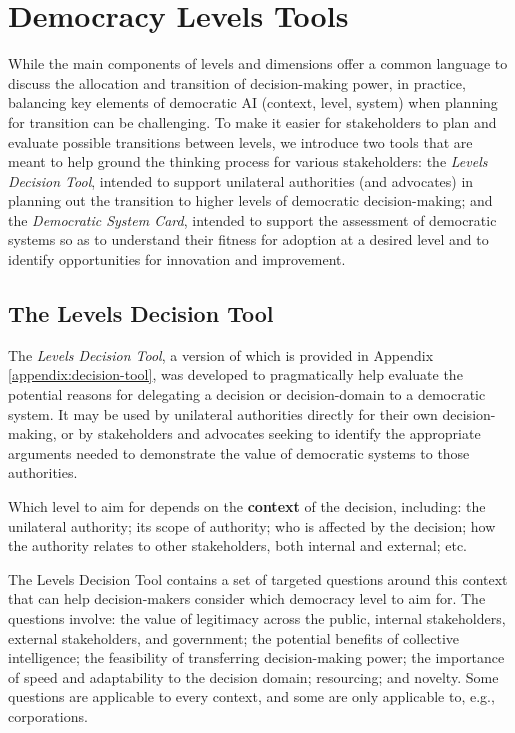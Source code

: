 \documentclass{article}
\begin{document}
\section{Democracy Levels Tools}
\label{sec:application}

    While the main components of levels and dimensions offer a common language to discuss the allocation and transition of decision-making power, in practice, balancing key elements of democratic AI (context, level, system) when planning for transition can be challenging. 
    To make it easier for stakeholders to plan and evaluate possible transitions between levels, we introduce two tools that are meant to help ground the thinking process for various stakeholders: the \textit{Levels Decision Tool}, intended to support unilateral authorities (and advocates) in planning out the transition to higher levels of democratic decision-making; and the \textit{Democratic System Card}, intended to support the assessment of democratic systems so as to understand their fitness for adoption at a desired level and to identify opportunities for innovation and improvement.

\subsection{The Levels Decision Tool}
\label{sec:decision-tool}

    The \textit{Levels Decision Tool}, a version of which is provided in Appendix \ref{appendix:decision-tool}, was developed to pragmatically help evaluate the potential reasons for delegating a decision or decision-domain to a democratic system. 
    It may be used by unilateral authorities directly for their own decision-making, or by stakeholders and advocates seeking to identify the appropriate arguments needed to demonstrate the value of democratic systems to those authorities.

    Which level to aim for depends on the \textbf{context} of the decision, including: the unilateral authority; its scope of authority; who is affected by the decision; how the authority relates to other stakeholders, both internal and external; etc. 

    The Levels Decision Tool contains a set of targeted questions around this context that can help decision-makers consider which democracy level to aim for. The questions involve: the value of legitimacy across the public, internal stakeholders, external stakeholders, and government; the potential benefits of collective intelligence; the feasibility of transferring decision-making power; the importance of speed and adaptability to the decision domain; resourcing; and novelty. Some questions are applicable to every context, and some are only applicable to, e.g., corporations.
\end{document}
